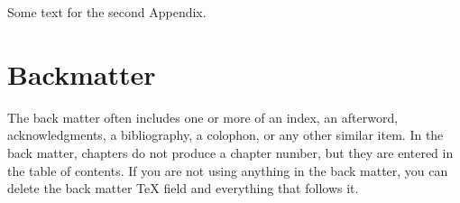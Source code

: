 \documentclass{book}%
\begin{document}
Some text for the second Appendix.

\backmatter

\part{Backmatter}

The back matter often includes one or more of an index, an afterword,
acknowledgments, a bibliography, a colophon, or any other similar item. In
the back matter, chapters do not produce a chapter number, but they are
entered in the table of contents. If you are not using anything in the back
matter, you can delete the back matter TeX field and everything that follows it.

\renewcommand\bibname{References}
\setlength{\bibsep}{2\baselineskip}
\setlength\bibindent{.5in}


\printglossary
\end{document}
